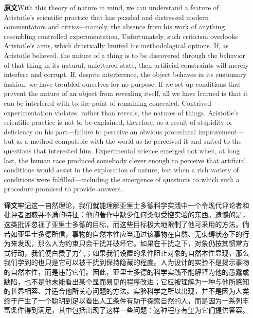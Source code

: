 \documentclass[UTF8,zihao=-4]{ctexart}
\newcommand{\BodyFont}{\fontsize{10.5pt}{15.5pt}\selectfont}
\newcommand{\origlabel}{\textbf{原文}\quad}
\newcommand{\translabel}{\textbf{译文}\quad}
\newcommand{\orig}{\par\noindent\begingroup\BodyFont\origlabel}
\newcommand{\zhline}[1]{\par\endgroup\noindent\begingroup\BodyFont\translabel #1\par\endgroup\vspace{0.35em}}
\begin{document}
\orig With this theory of nature in mind, we can understand a feature of Aristotle's scientific practice that has puzzled and distressed modern commentators and critics---namely, the absence from his work of anything resembling controlled experimentation. Unfortunately, such criticism overlooks Aristotle's aims, which drastically limited his methodological options. If, as Aristotle believed, the nature of a thing is to be discovered through the behavior of that thing in its natural, unfettered state, then artificial constraints will merely interfere and corrupt. If, despite interference, the object behaves in its customary fashion, we have troubled ourselves for no purpose. If we set up conditions that prevent the nature of an object from revealing itself, all we have learned is that it can be interfered with to the point of remaining concealed. Contrived experimentation violates, rather than reveals, the natures of things. Aristotle's scientific practice is not to be explained, therefore, as a result of stupidity or deficiency on his part---failure to perceive an obvious procedural improvement---but as a method compatible with the world as he perceived it and suited to the questions that interested him. Experimental science emerged not when, at long last, the human race produced somebody clever enough to perceive that artificial conditions would assist in the exploration of nature, but when a rich variety of conditions were fulfilled---including the emergence of questions to which such a procedure promised to provide answers.

\zhline{牢记这一自然理论，我们就能理解亚里士多德科学实践中一个令现代评论者和批评者困惑并不满的特征：他的著作中缺少任何类似受控实验的东西。遗憾的是，这类批评忽视了亚里士多德的目标，而这些目标极大地限制了他可采用的方法。倘若如亚里士多德所信，事物的自然本性应当通过该事物在自然、无束缚状态下的行为来发现，那么人为约束只会干扰并破坏它。如果在干扰之下，对象仍按其惯常方式行动，我们便白费了力气；如果我们设置的条件阻止对象的自然本性显现，那么我们学到的也只是它可以被干扰到保持隐藏的程度。人为设计的实验不是揭示事物的自然本性，而是违背它们。因此，亚里士多德的科学实践不能解释为他的愚蠢或缺陷，也不是他未能看出某个显而易见的程序改进；它应被理解为一种与他所感知的世界相容、并适合他所关心问题的方法。实验科学之所以出现，并不是因为人类终于产生了一个聪明到足以看出人工条件有助于探索自然的人，而是因为一系列丰富条件得到满足，其中包括出现了这样一些问题：这种程序有望为它们提供答案。}
\end{document}

